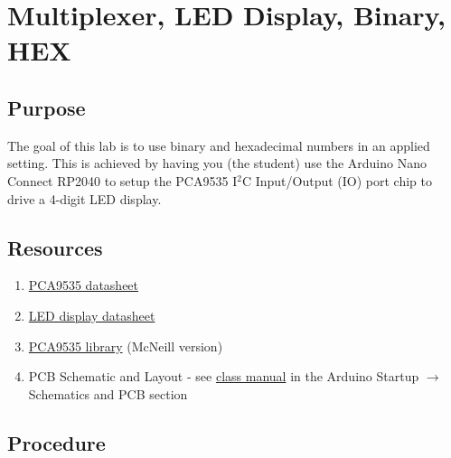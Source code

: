 \chapter{Multiplexer, LED Display, Binary, HEX}

\section{Purpose}
The goal of this lab is to use binary and hexadecimal numbers in an applied setting. This is 
achieved by having you (the student) use the Arduino Nano Connect RP2040 to setup the 
PCA9535 I$^2$C Input/Output (IO) port chip to drive a 4-digit LED display.

\section{Resources}\label{sec:resources}
\begin{enumerate}
    \item \href{https://www.nxp.com/docs/en/data-sheet/PCA9535_PCA9535C.pdf}{PCA9535 datasheet}
    \item \href{https://datasheet.lcsc.com/lcsc/1810191633_SUNLIGHT-SLR0394FG3C5BD-3-5_C225905.pdf}{LED display datasheet}
    \item \href{https://github.com/semcneil/PCA95x5}{PCA9535 library} (McNeill version)
    \item PCB Schematic and Layout - see 
            \href{https://github.com/semcneil/Fundamentals-of-Microcontrollers-Manual}{class manual} 
            in the Arduino Startup $\rightarrow$ Schematics and PCB section
\end{enumerate}

\section{Procedure}
